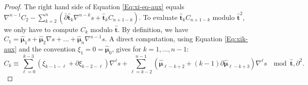 \documentclass[11pt]{amsart}
\numberwithin{thm}{section} %
\numberwithin{equation}{section} %
\numberwithin{figure}{section} %
\begin{document}
\begin{proof}
The right hand side of Equation \eqref{Eq:xi-eq-aux} equals $\nabla^{n-1}C_2-\sum_{k=2}^n(\bar\partial\bm\hat{t}_k\nabla^{n-k}s+\bm\hat{t}_kC_{n+1-k}).$
To evaluate $\bm\hat{t}_{k}C_{n+1-k}$ modulo $\bm\hat{t}^2$, we only have to compute $C_{k}$ modulo $\bm\hat{t}$. By definition, we have $C_1=\bm\hat{\mu}_1s+\bm\hat{\mu}_2\nabla s+...+\bm\hat{\mu}_{n}\nabla^{n-1}s$. A direct computation, using Equation \eqref{Eq:xik-aux} and the convention $\xi_1=0=\bm\hat{\mu}_0$, gives for $k=1,...,n-1$:
\begin{equation}\label{Eq:aux.3}
C_k\equiv \sum_{\ell=0}^{k-3} (\xi_{k-1-\ell}+\partial\xi_{k-2-\ell})\nabla^{\ell}s+\sum_{\ell=k-2}^{n-1}(\bm\hat{\mu}_{\ell-k+2}+(k-1)\partial\bm\hat{\mu}_{\ell-k+3})\nabla^{\ell}s \;\mod \bm\hat{t},\partial^2.
\end{equation}



\end{proof}
\end{document}
